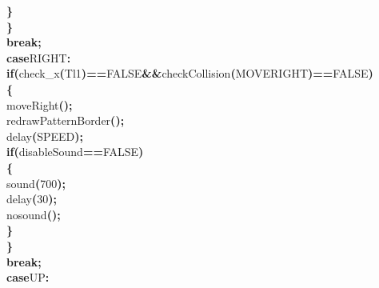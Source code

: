 \documentclass[a4paper, 10pt]{article}
\newcommand\SPC{\hspace*{0.6em}}
\newcommand\HYP{\mbox{\char 45}}
\newcommand{\CppAIdentifier}[1]{#1}
\newcommand{\CppANumber}[1]{\textcolor[rgb]{0.5,0,0.5}{#1}}
\newcommand{\CppAReservedWord}[1]{\textbf{#1}}
\newcommand{\CppASpace}[1]{\colorbox[rgb]{1,1,1}{#1}}
\newcommand{\CppASymbol}[1]{\textbf{\textcolor[rgb]{1,0,0}{#1}}}
\begin{document}
\begin{ttfamily}
\CppASpace{\SPC \SPC \SPC \SPC \SPC }\CppASymbol{\}}\\
\CppASpace{\SPC \SPC \SPC \SPC }\CppASymbol{\}}\\
\CppASpace{\SPC \SPC \SPC \SPC }\CppAReservedWord{break}\CppASymbol{;}\\
\CppASpace{\SPC \SPC \SPC \SPC }\CppAReservedWord{case}\CppASpace{\SPC }\CppAIdentifier{RIGHT}\CppASymbol{:}\\
\CppASpace{\SPC \SPC \SPC \SPC }\CppAReservedWord{if}\CppASymbol{(}\CppAIdentifier{check\_x}\CppASymbol{(}\CppAIdentifier{Tl}\CppASymbol{\HYP }\CppANumber{1}\CppASymbol{)}\CppASymbol{==}\CppAIdentifier{FALSE}\CppASpace{\SPC }\CppASymbol{\&\&}\CppASpace{\SPC }\CppAIdentifier{checkCollision}\CppASymbol{(}\CppAIdentifier{MOVERIGHT}\CppASymbol{)}\CppASymbol{==}\CppAIdentifier{FALSE}\CppASpace{\SPC }\CppASymbol{)}\\
\CppASpace{\SPC \SPC \SPC \SPC }\CppASymbol{\{}\\
\CppASpace{\SPC \SPC \SPC \SPC \SPC }\CppAIdentifier{moveRight}\CppASymbol{(}\CppASymbol{)}\CppASymbol{;}\\
\CppASpace{\SPC \SPC \SPC \SPC \SPC }\CppAIdentifier{redrawPatternBorder}\CppASymbol{(}\CppASymbol{)}\CppASymbol{;}\\
\CppASpace{\SPC \SPC \SPC \SPC \SPC }\CppAIdentifier{delay}\CppASymbol{(}\CppAIdentifier{SPEED}\CppASymbol{)}\CppASymbol{;}\\
\CppASpace{\SPC \SPC \SPC \SPC \SPC }\CppAReservedWord{if}\CppASymbol{(}\CppAIdentifier{disableSound}\CppASymbol{==}\CppAIdentifier{FALSE}\CppASymbol{)}\\
\CppASpace{\SPC \SPC \SPC \SPC \SPC }\CppASymbol{\{}\\
\CppASpace{\SPC \SPC \SPC \SPC \SPC \SPC }\CppAIdentifier{sound}\CppASymbol{(}\CppANumber{700}\CppASymbol{)}\CppASymbol{;}\\
\CppASpace{\SPC \SPC \SPC \SPC \SPC \SPC }\CppAIdentifier{delay}\CppASymbol{(}\CppANumber{30}\CppASymbol{)}\CppASymbol{;}\\
\CppASpace{\SPC \SPC \SPC \SPC \SPC \SPC }\CppAIdentifier{nosound}\CppASymbol{(}\CppASymbol{)}\CppASymbol{;}\\
\CppASpace{\SPC \SPC \SPC \SPC \SPC }\CppASymbol{\}}\\
\CppASpace{\SPC \SPC \SPC \SPC }\CppASymbol{\}}\\
\CppASpace{\SPC \SPC \SPC \SPC }\CppAReservedWord{break}\CppASymbol{;}\\
\CppASpace{\SPC \SPC \SPC \SPC }\CppAReservedWord{case}\CppASpace{\SPC }\CppAIdentifier{UP}\CppASymbol{:}\\

\end{ttfamily}
\end{document}
